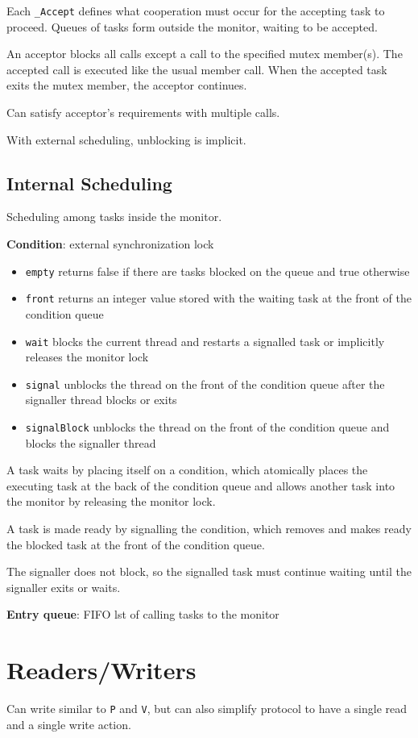 \documentclass[11pt]{article}
\begin{document}
Each \texttt{\_Accept} defines what cooperation must occur for the accepting task to proceed.
Queues of tasks form outside the monitor, waiting to be accepted.

An acceptor blocks all calls except a call to the specified mutex member(s).
The accepted call is executed like the usual member call.
When the accepted task exits the mutex member, the acceptor continues.

Can satisfy acceptor's requirements with multiple calls.

With external scheduling, unblocking is implicit.
\subsection{Internal Scheduling}
\label{sec:orgdfb23c8}
Scheduling among tasks inside the monitor.

\textbf{Condition}: external synchronization lock
\begin{itemize}
\item \texttt{empty} returns false if there are tasks blocked on the queue and true otherwise
\item \texttt{front} returns an integer value stored with the waiting task at the front of the condition queue
\item \texttt{wait} blocks the current thread and restarts a signalled task or implicitly releases the monitor lock
\item \texttt{signal} unblocks the thread on the front of the condition queue after the signaller thread blocks or
exits
\item \texttt{signalBlock} unblocks the thread on the front of the condition queue and blocks the signaller thread
\end{itemize}

A task waits by placing itself on a condition, which atomically places the executing task at the back
of the condition queue and allows another task into the monitor by releasing the monitor lock.

A task is made ready by signalling the condition, which removes and makes ready the blocked task
at the front of the condition queue.

The signaller does not block, so the signalled task must continue waiting until the signaller exits
or waits.

\textbf{Entry queue}: FIFO lst of calling tasks to the monitor
\section{Readers/Writers}
\label{sec:org3067474}
Can write similar to \texttt{P} and \texttt{V}, but can also simplify protocol to have a single read and a single
write action.
\end{document}
